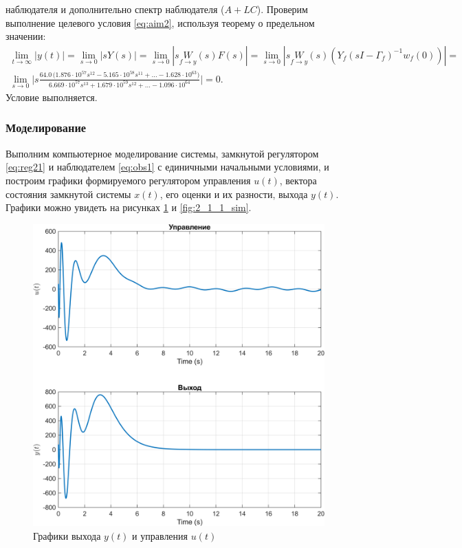 наблюдателя и дополнительно спектр наблюдателя ($A+LC$).
Проверим выполнение целевого условия \eqref{eq:aim2}, используя теорему о предельном
значении:
\begin{multline*}
    \lim_{t\rightarrow\infty}|y(t)|=\lim_{s\rightarrow0}|sY(s)|=
    \lim_{s\rightarrow0}|s\underset{f\rightarrow y}{W}(s)F(s)|=
    \lim_{s\rightarrow0}|s\underset{f\rightarrow y}{W}(s)(Y_f(sI-\Gamma_f)^{-1}w_{f}(0))|=\\
    \lim_{s\rightarrow0}\Bigg|s\frac{64.0\,\Big(1.876 \cdot 10^{57}s^{12} - 5.165 \cdot 10^{58}s^{11} + \dots - 1.628 \cdot 10^{63}\Big)}{
    6.669 \cdot 10^{57}s^{13} + 1.679 \cdot 10^{59}s^{12} + \dots - 1.096 \cdot 10^{64}}\Bigg|=0.
\end{multline*}
Условие выполняется.

\subsubsection{Моделирование}

Выполним компьютерное моделирование системы, замкнутой регулятором
\eqref{eq:reg21} и наблюдателем \eqref{eq:obs1} с единичными начальными условиями, 
и построим графики формируемого 
регулятором управления $u(t)$, вектора состояния замкнутой системы $x(t)$, его оценки и их разности, выхода
$y(t)$. Графики можно
увидеть на рисунках \ref{fig:2_1_0_sim} и \ref{fig:2_1_1_sim}.

\begin{figure}[H]
    \centering
    \includegraphics[width=\linewidth]{figs/2_1_0_sim.png}
    \caption{Графики выхода
    $y(t)$ и управления $u(t)$}
    \label{fig:2_1_0_sim}
\end{figure}

